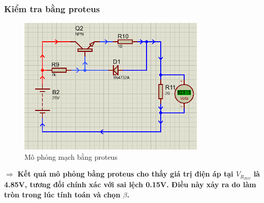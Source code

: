     \subsubsection{Kiểm tra bằng proteus}
    \begin{figure}[H]
        \centering
        \includegraphics[width=0.8\textwidth]{pictures/result5_b.png}
        \caption{Mô phỏng mạch bằng proteus}
    \end{figure}
    $\Rightarrow$ 
    \textbf{Kết quả mô phỏng bằng proteus cho thấy giá trị điện áp tại $V_{R_{20\Omega }}$ là 4.85V, tương đối chính xác với sai lệch 0.15V. Điều này xảy ra do làm tròn trong lúc tính toán và chọn $\beta$.}
